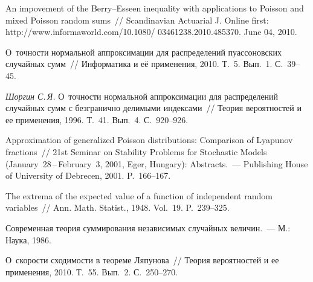 \begin{multicols}{2}
{{\begin{thebibliography}{99}
 An impovement of the Berry--Esseen
inequality with applications to Poisson and mixed Poisson random
sums~// Scandinavian Actuarial J. Online first:
{\sf http://www.informaworld.com/10.1080/ 03461238.2010.485370}. June 04,
2010.


 О~точности нормальной
аппроксимации для распределений пуассоновских случайных сумм~//
Информатика и её применения, 2010. Т.~5. Вып.~1. С.~39--45.

{\it Шоргин С.\,Я.} О~точности нормальной аппроксимации для
распределений случайных сумм с безгранично делимыми индексами~//
Теория вероятностей и ее применения, 1996. Т.~41. Вып.~4. С.~920--926.


 Approximation of generalized Poisson
distributions: Comparison of Lyapunov fractions~// 21st Seminar on
Stability Problems for Stochastic Models (January~28\,--\,February~3,
2001, Eger, Hungary): Abstracts.~--- Publishing House of University
of Debrecen, 2001. P.~166--167.

 The extrema of the expected value of a function of
independent random variables~// Ann. Math. Statist., 1948. Vol.~19.
P.~239--325.



\label{end\stat}

 Современная теория суммирования независимых
случайных величин.~--- М.: Наука, 1986.

 О~скорости сходимости в теореме Ляпунова~//
Теория вероятностей и ее применения, 2010. Т.~55. Вып.~2. С.~250--270.

 \end{thebibliography}
}
}


\end{multicols}       